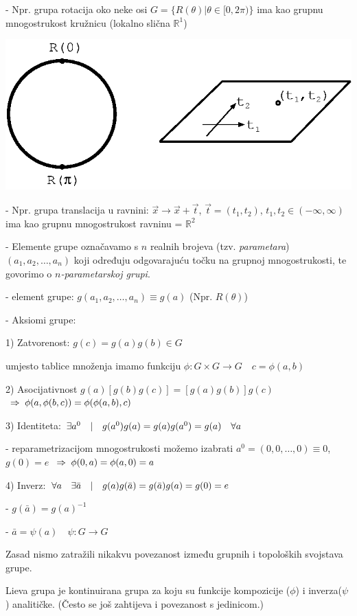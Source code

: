 - Npr. grupa rotacija oko neke osi $G=\{R(\theta) | \theta\in[0,2\pi)\}$
  ima kao grupnu mnogostrukost kružnicu (lokalno slična $\mathbb{R}^1$)

\centerline{\includegraphics[scale=1.0]{pics/mnogostrukost.eps}}

- Npr. grupa translacija u ravnini: $\vec{x}\to\vec{x}+\vec{t}$,
  $\vec{t}=(t_1, t_2)$, $t_1, t_2 \in (-\infty, \infty)$ ima kao
 grupnu mnogostrukost ravninu = $\mathbb{R}^2$

- Elemente grupe označavamo s $n$ realnih brojeva (tzv. \emph{parametara}) 
  $(a_1, a_2, \ldots, a_n)$ koji određuju odgovarajuću točku na 
  grupnoj mnogostrukosti, te govorimo o \emph{$n$-parametarskoj grupi}.

- element grupe: $g(a_1, a_2, \ldots, a_n)\equiv g(a)$ (Npr. $R(\theta)$)

- Aksiomi grupe:

1) Zatvorenost: $g(c)=g(a)g(b) \in G$

    umjesto tablice množenja imamo funkciju $\phi: G\times G \to G \quad 
      c=\phi(a,b)$

2) Asocijativnost $g(a)[g(b)g(c)]=[g(a)g(b)]g(c)$ 
    $\;\Rightarrow\; \phi(a, \phi(b,c))=\phi(\phi(a,b),c) $

3) Identiteta: $\exists a^0 \quad | \quad g(a^0)g(a)=g(a)g(a^0)=g(a)\quad \forall a$

    - reparametrizacijom mnogostrukosti možemo izabrati $a^0=(0, 0, \ldots, 0)
     \equiv 0$, $g(0)=e$ $\;\Rightarrow\; \phi(0,a)=\phi(a,0)=a$

4) Inverz: $\forall a\quad \exists \bar{a} \quad | \quad g(a)g(\bar{a})=
        g(\bar{a})g(a)=g(0)=e$

    - $g(\bar{a})=g(a)^{-1}$

    - $\bar{a}=\psi(a) \quad \psi:G\to G$


Zasad nismo zatražili nikakvu povezanost između grupnih i topoloških
svojstava grupe. 


\begin{definicija}
  Lieva grupa je kontinuirana grupa za koju su funkcije kompozicije
($\phi$) i inverza($\psi$) analitičke. (Često se još zahtijeva i
povezanost s jedinicom.)
\end{definicija}


